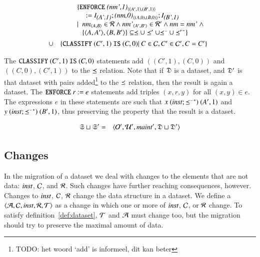 \documentclass{elsarticle}
\begin{document}
\begin{definition}
   \begin{eqnarray}
      &&\begin{array}[t]{@{}l}
         \{ {\tt ENFORCE\ }\declare{(nm',1)}{(A',1)}{(B',1)}\\\quad{\tt\ :=\ }\ident{(A',1)};\declare{(nm,0)}{(A,0)}{(B,0)};\ident{(B',1)}\\
            \mid\ \begin{array}[t]{@{}l}
               \declare{nm}{A}{B}\in\rels\wedge\declare{nm'}{A'}{B'}\in\rels'\wedge\id{nm}=\id{nm'}\ \wedge\\
               \{\pair{A}{A'},\pair{B}{B'}\}\subseteq\isa\cup\isa'\cup\flip{\isa}\cup\flip{\isa'}\}
               \end{array}
           \end{array}\\
           &\cup&\begin{array}[t]{@{}l}
            \{ {\tt CLASSIFY\ }(C',1){\tt\ IS\ }(C,0)|\ C\in\concepts,C'\in\concepts',C=C'\}\\
           \end{array}
   \end{eqnarray}
\end{definition}

The ${\tt CLASSIFY\ }(C',1){\tt\ IS\ }(C,0)$ statements add $((C',1),(C,0))$ and  $((C,0),(C',1))$ to the $\preceq$ relation. Note that if $\mathfrak{D}$ is a dataset, and $\mathfrak{D}'$ is that dataset with pairs added\footnote{TODO: het woord `add' is informeel, dit kan beter} to the $\preceq$ relation, then the result is again a dataset.
The ${\tt ENFORCE\ }r{\tt\ :=\ }e$ statements add triples $(x,r,y)$ for all $(x,y)\in e$.
The expressions $e$ in these statements are such that $x\ (\text{\it inst\/} ; {{\preceq}^\smallsmile}^*)\ (A',1)$ and $y \ (\inst \compose \kleenestar{\flip{\isa}})\ (B',1)$, thus preserving the property that the result is a dataset.

\begin{definition}[]
   \begin{eqnarray}
      \mathfrak{S}\sqcup\mathfrak{S}'&=&\langle\mathcal{O}',\mathcal{U}',\text{\it maint\/}',\mathfrak{D}\sqcup\mathfrak{D}'\rangle
   \end{eqnarray}
\end{definition}

\subsection{Changes}
   In the migration of a dataset we deal with changes to the elements that are not data:
   $\text{\it inst\/}$, $\mathcal{C}$, and $\mathcal{R}$.
   Such changes have further reaching consequences, however.
   Changes to $\text{\it inst\/}$, $\mathcal{C}$, $\mathcal{R}$ change the data structure in a dataset.
   We define a  $\langle\mathcal{A},\mathcal{C},\text{\it inst\/},\mathcal{R},\mathcal{T}\rangle$ as a change in which one or more of $\text{\it inst\/}$, $\mathcal{C}$, or $\mathcal{R}$ change.
   To satisfy definition~\ref{def:dataset}, $\mathcal{T}$ and $\mathcal{A}$ must change too,
   but the migration should try to preserve the maximal amount of data.
\end{document}
